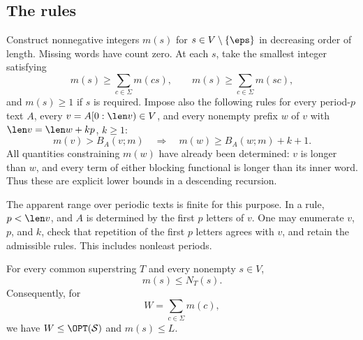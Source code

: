 \subsection{The rules}

Construct nonnegative integers $m(s)$ for $s\in V\setminus\{\eps\}$ in decreasing order of length. Missing words have count zero. At each $s$, take the smallest integer satisfying
\begin{equation}\label{eq:extension-rules}
m(s)\ge\sum_{c\in\Sigma}m(cs),\qquad
m(s)\ge\sum_{c\in\Sigma}m(sc),
\end{equation}
and $m(s)\ge1$ if $s$ is required. Impose also the following rules for every period-$p$ text $A$, every $v=A[0:\len v)\in V$, and every nonempty prefix $w$ of $v$ with $\len v=\len w+kp$, $k\ge1$:
\begin{equation}\label{eq:period-rule}
m(v)>B_A(v;m)
\quad\Longrightarrow\quad
m(w)\ge B_A(w;m)+k+1.
\end{equation}
All quantities constraining $m(w)$ have already been determined: $v$ is longer than $w$, and every term of either blocking functional is longer than its inner word. Thus these are explicit lower bounds in a descending recursion.

The apparent range over periodic texts is finite for this purpose. In a rule, $p<\len v$, and $A$ is determined by the first $p$ letters of $v$. One may enumerate $v$, $p$, and $k$, check that repetition of the first $p$ letters agrees with $v$, and retain the admissible rules. This includes nonleast periods.

\begin{lemma}\label{lem:counts}
For every common superstring $T$ and every nonempty $s\in V$,
\[
m(s)\le N_T(s).
\]
Consequently, for
\begin{equation}\label{eq:W}
W=\sum_{c\in\Sigma}m(c),
\end{equation}
we have $W\le\OPT(\mathcal S)$ and $m(s)\le L$.
\end{lemma}

